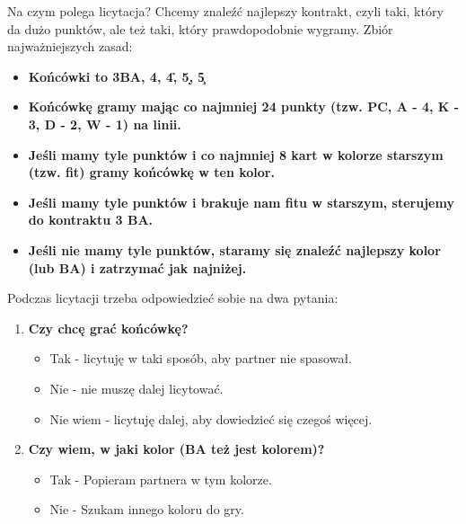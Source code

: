 \documentclass{article}
\begin{document}
Na czym polega licytacja? Chcemy znaleźć najlepszy kontrakt, czyli taki, który da dużo punktów, ale też taki, który prawdopodobnie wygramy.
Zbiór najważniejszych zasad:
\begin{itemize}
	\item \bf{Końcówki to 3BA, 4\s, 4\h, 5\d, 5\c}
	\item \bf{Końcówkę gramy mając co najmniej 24 punkty (tzw. PC, A - 4, K - 3, D - 2, W - 1) na linii.}
	\item \bf{Jeśli mamy tyle punktów i co najmniej 8 kart w kolorze starszym (tzw. fit) gramy końcówkę w ten kolor.}
	\item \bf{Jeśli mamy tyle punktów i brakuje nam fitu w starszym, sterujemy do kontraktu 3 BA.}
	\item \bf{Jeśli nie mamy tyle punktów, staramy się znaleźć najlepszy kolor (lub BA) i zatrzymać jak najniżej.}
\end{itemize}
Podczas licytacji trzeba odpowiedzieć sobie na dwa pytania:
\begin{enumerate}
	\item \bf{Czy chcę grać końcówkę?}
		\begin{itemize}
			\item Tak - licytuję w taki sposób, aby partner nie spasował.
			\item Nie - nie muszę dalej licytować.
			\item Nie wiem - licytuję dalej, aby dowiedzieć się czegoś więcej.
		\end{itemize}
	\item \bf{Czy wiem, w jaki kolor (BA też jest kolorem)?}
		\begin{itemize}
			\item Tak - Popieram partnera w tym kolorze.
			\item Nie - Szukam innego koloru do gry.
		\end{itemize}
\end{enumerate}
\end{document}
